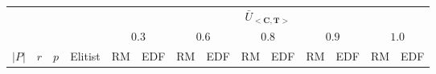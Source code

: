 \begin{tabular}{c c c c c c c c c c c c c c}
\toprule
& & & & \multicolumn{10}{c}{$\bar{U}_{<\mathbf{C}, \mathbf{T}>}$}\\
 &  &  & & \multicolumn{2}{c}{$0.3$} & \multicolumn{2}{c}{$0.6$} & \multicolumn{2}{c}{$0.8$} & \multicolumn{2}{c}{$0.9$} & \multicolumn{2}{c}{$1.0$}\\
\cmidrule(lr){5-6} \cmidrule(lr){7-8}  \cmidrule(lr){9-10} \cmidrule(lr){11-12}  \cmidrule(lr){13-14}
$|P|$ & $r$ & $p$ & Elitist & RM & EDF & RM & EDF & RM & EDF & RM & EDF & RM & EDF \\
\cmidrule(lr){1-4} \cmidrule(lr){5-5} \cmidrule(lr){6-6} \cmidrule(lr){7-7} \cmidrule(lr){8-8} \cmidrule(lr){9-9} \cmidrule(lr){10-10} \cmidrule(lr){11-11} \cmidrule(lr){12-12} \cmidrule(lr){13-13} \cmidrule(lr){14-14}



\end{tabular}
